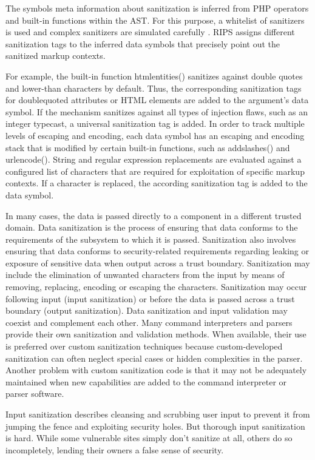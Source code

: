 The symbols meta information about sanitization is inferred
from PHP operators and built-in functions within the
AST. For this purpose, a whitelist of sanitizers is used and
complex sanitizers are simulated carefully \cite{ref_93_dahse2014simulation}. RIPS assigns
different sanitization tags to the inferred data symbols that
precisely point out the sanitized markup contexts.

For example, the built-in function htmlentities() sanitizes
against double quotes and lower-than characters by default.
Thus, the corresponding sanitization tags for doublequoted
attributes or HTML elements are added to the argument's
data symbol. If the mechanism sanitizes against all
types of injection flaws, such as an integer typecast, a universal
sanitization tag is added. In order to track multiple levels
of escaping and encoding, each data symbol has an escaping
and encoding stack that is modified by certain built-in
functions, such as addslashes() and urlencode(). String
and regular expression replacements are evaluated against a
configured list of characters that are required for exploitation
of specific markup contexts. If a character is replaced,
the according sanitization tag is added to the data symbol.


In many cases, the data is passed directly to a component in a different trusted domain. Data sanitization is the process of ensuring that data conforms to the requirements of the subsystem to which it is passed. Sanitization also involves ensuring that data conforms to security-related requirements regarding leaking or exposure of sensitive data when output across a trust boundary. Sanitization may include the elimination of unwanted characters from the input by means of removing, replacing, encoding or escaping the characters. Sanitization may occur following input (input sanitization) or before the data is passed across a trust boundary (output sanitization). Data sanitization and input validation may coexist and complement each other. Many command interpreters and parsers provide their own sanitization and validation methods. When available, their use is preferred over custom sanitization techniques because custom-developed sanitization can often neglect special cases or hidden complexities in the parser. Another problem with custom sanitization code is that it may not be adequately maintained when new capabilities are added to the command interpreter or parser software.

Input sanitization describes cleansing and scrubbing user input to prevent it from jumping the fence and exploiting security holes. But thorough input sanitization is hard. While some vulnerable sites simply don't sanitize at all, others do so incompletely, lending their owners a false sense of security.

